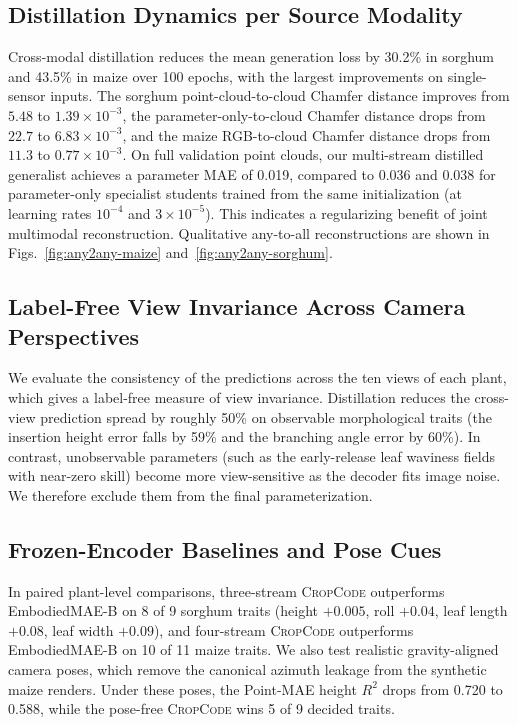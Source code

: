 \documentclass[10pt,twocolumn,letterpaper]{article}
\newcommand{\method}{\textup{\textsc{CropCode}}}   %
\begin{document}
\subsection{Distillation Dynamics per Source Modality}
Cross-modal distillation reduces the mean generation loss by 30.2\% in sorghum and 43.5\% in maize over 100 epochs, with the largest improvements on single-sensor inputs. The sorghum point-cloud-to-cloud Chamfer distance improves from $5.48$ to $1.39 \times 10^{-3}$, the parameter-only-to-cloud Chamfer distance drops from $22.7$ to $6.83 \times 10^{-3}$, and the maize RGB-to-cloud Chamfer distance drops from $11.3$ to $0.77 \times 10^{-3}$. On full validation point clouds, our multi-stream distilled generalist achieves a parameter MAE of 0.019, compared to 0.036 and 0.038 for parameter-only specialist students trained from the same initialization (at learning rates $10^{-4}$ and $3 \times 10^{-5}$). This indicates a regularizing benefit of joint multimodal reconstruction. Qualitative any-to-all reconstructions are shown in \textcolor{cvprblue}{Figs.}~\ref{fig:any2any-maize} and~\ref{fig:any2any-sorghum}.

\subsection{Label-Free View Invariance Across Camera Perspectives}
We evaluate the consistency of the predictions across the ten views of each plant, which gives a label-free measure of view invariance. Distillation reduces the cross-view prediction spread by roughly 50\% on observable morphological traits (the insertion height error falls by 59\% and the branching angle error by 60\%). In contrast, unobservable parameters (such as the early-release leaf waviness fields with near-zero skill) become more view-sensitive as the decoder fits image noise. We therefore exclude them from the final parameterization.

\subsection{Frozen-Encoder Baselines and Pose Cues}
In paired plant-level comparisons, three-stream \method{} outperforms EmbodiedMAE-B on 8 of 9 sorghum traits (height $+0.005$, roll $+0.04$, leaf length $+0.08$, leaf width $+0.09$), and four-stream \method{} outperforms EmbodiedMAE-B on 10 of 11 maize traits. We also test realistic gravity-aligned camera poses, which remove the canonical azimuth leakage from the synthetic maize renders. Under these poses, the Point-MAE height $R^2$ drops from 0.720 to 0.588, while the pose-free \method{} wins 5 of 9 decided traits.
\end{document}
